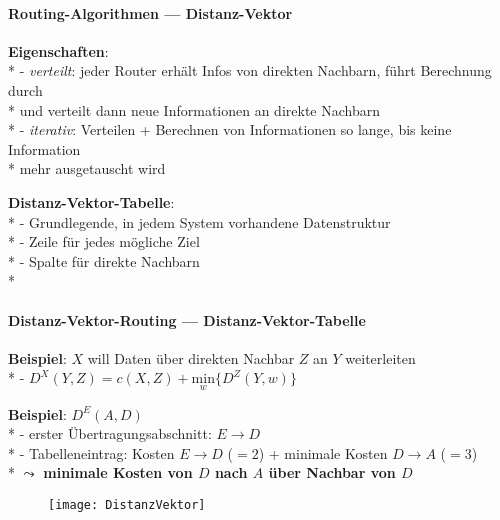 \paragraph{Routing-Algorithmen --- Distanz-Vektor}
\begin{items}
  \item \textbf{Eigenschaften}: \\*
    - \emph{verteilt}: jeder Router erhält Infos von direkten Nachbarn, führt Berechnung durch \\* \phantom{-} \phantom{\( \cdot \)} und verteilt dann neue Informationen an direkte Nachbarn \\*
    - \emph{iterativ}: Verteilen + Berechnen von Informationen so lange, bis keine Information \\* \phantom{-} \phantom{\( \cdot \)} mehr ausgetauscht wird
  \item \textbf{Distanz-Vektor-Tabelle}: \\*
    - Grundlegende, in jedem System vorhandene Datenstruktur \\*
    - Zeile für jedes mögliche Ziel \\*
    - Spalte für direkte Nachbarn \\*
\end{items}

\paragraph{Distanz-Vektor-Routing --- Distanz-Vektor-Tabelle}
\begin{items}
  \item \textbf{Beispiel}: \( X \) will Daten über direkten Nachbar \( Z \) an \( Y \) weiterleiten \\*
    - \( D^X(Y,Z) = c(X,Z) + \underset{w}{\text{min}}\{ D^Z(Y,w) \} \)
  \item \textbf{Beispiel}: \( D^E(A,D) \) \\*
    - erster Übertragungsabschnitt: \( E \to D \) \\*
    - Tabelleneintrag: Kosten \( E \to D \) (\( =2 \)) + minimale Kosten \( D \to A \) (\( =3 \)) \\*
    \phantom{-} \( \leadsto \) \textbf{minimale Kosten von \( D \) nach \( A \) über Nachbar von \( D \)}
\end{items}
\begin{figure}[H]\centering\label{DistanzVektor}\texttt{[image: DistanzVektor]}\end{figure}

